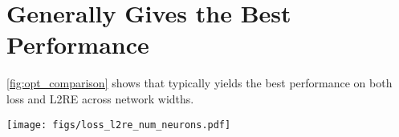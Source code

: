 \section{\al{} Generally Gives the Best Performance}
\label{sec:opt_comparison_additional}
\cref{fig:opt_comparison} shows that \al{} typically yields the best performance on both loss and L2RE across network widths. 
\begin{figure*}
    \centering
    \texttt{[image: figs/loss\_l2re\_num\_neurons.pdf]}
    \caption{Performance of Adam, \lbfgs, and \al{} after tuning. 
    We find the learning rate $\eta^\star$ for each network width and optimization strategy that attains the lowest loss (L2RE) across all random seeds.
    The min, median, and max loss (L2RE) are calculated by taking the min, median, and max of the losses (L2REs) for learning rate $\eta^*$ across all random seeds.
    Each bar on the plot corresponds to the median, while the top and bottom error bars correspond to the max and min, respectively.
    The smallest min loss and L2RE are always attained by one of the \al{} strategies; the smallest median loss and L2RE are nearly always attained by one of the \al{} strategies.}
    \label{fig:opt_comparison}
\end{figure*}